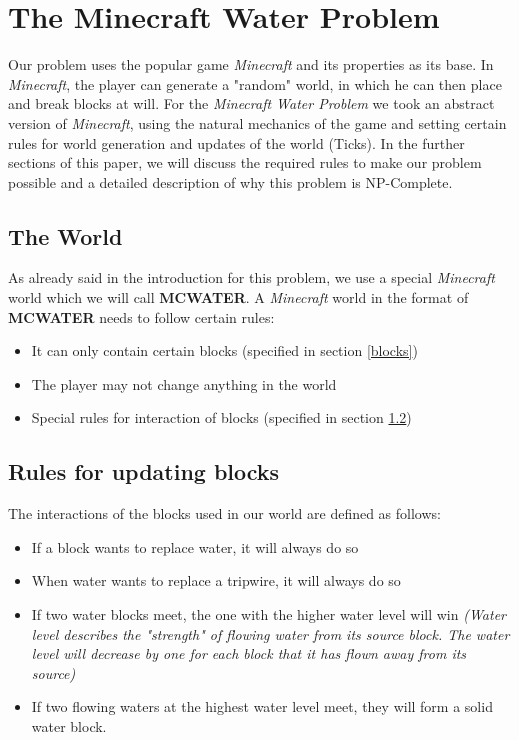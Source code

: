 \section{The Minecraft Water Problem}
\noindent Our problem uses the popular game \textit{Minecraft} and its properties as its base. In \textit{Minecraft}, the player can generate a "random" world, in which he can then place and break blocks at will. For the \textit{Minecraft Water Problem} we took an abstract version of \textit{Minecraft}, using the natural mechanics of the game and setting certain rules for world generation and updates of the world (Ticks). In the further sections of this paper, we will discuss the required rules to make our problem possible and a detailed description of why this problem is NP-Complete.

\subsection{The World} 

\noindent As already said in the introduction for this problem, we use a special \textit{Minecraft} world which we will call \textbf{MCWATER}. A \textit{Minecraft} world in the format of \textbf{MCWATER} needs to follow certain rules:

\begin{itemize}
    \item It can only contain certain blocks (specified in section \ref{blocks})
    \item The player may not change anything in the world
    \item Special rules for interaction of blocks (specified in section \ref{rules})
\end{itemize}

\subsection{Rules for updating blocks} \label{rules}
\noindent The interactions of the blocks used in our world are defined as follows:

\begin{itemize}
    \item If a block wants to replace water, it will always do so
    \item When water wants to replace a tripwire, it will always do so
    \item If two water blocks meet, the one with the higher water level will win \textit{(Water level describes the "strength" of flowing water from its source block. The water level will decrease by one for each block that it has flown away from its source)}
    \item If two flowing waters at the highest water level meet, they will form a solid water block.
\end{itemize}

